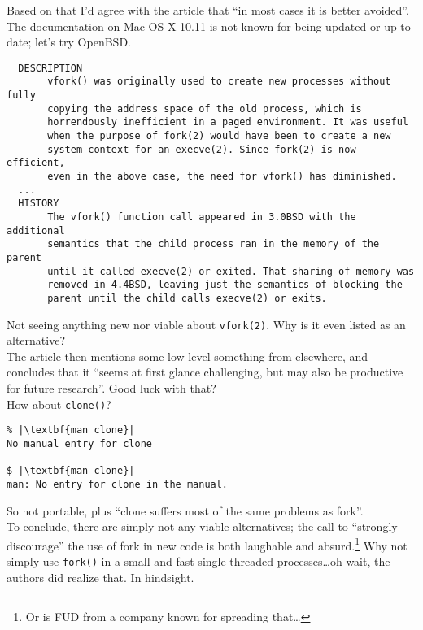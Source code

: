 \documentclass[10pt,a4paper]{article}
\begin{document}
Based on that I'd agree with the article that ``in most cases it is
better avoided''\citep[p.5]{Hotos2019}. The documentation on Mac OS X
10.11 is not known for being updated or up-to-date; let's try OpenBSD.

\begin{lstlisting}
  DESCRIPTION
       vfork() was originally used to create new processes without fully
       copying the address space of the old process, which is
       horrendously inefficient in a paged environment. It was useful
       when the purpose of fork(2) would have been to create a new
       system context for an execve(2). Since fork(2) is now efficient,
       even in the above case, the need for vfork() has diminished.
  ...
  HISTORY
       The vfork() function call appeared in 3.0BSD with the additional
       semantics that the child process ran in the memory of the parent
       until it called execve(2) or exited. That sharing of memory was
       removed in 4.4BSD, leaving just the semantics of blocking the
       parent until the child calls execve(2) or exits.
\end{lstlisting}

Not seeing anything new nor viable about \texttt{vfork(2)}. Why is it
even listed as an alternative? \\

The article then mentions some low-level something from elsewhere,
and concludes that it ``seems at first glance challenging, but may
also be productive for future research''\citep[p.6]{Hotos2019}. Good
luck with that? \\

How about \texttt{clone()}?

\begin{lstlisting}
% |\textbf{man clone}|
No manual entry for clone

$ |\textbf{man clone}|
man: No entry for clone in the manual.
\end{lstlisting}

So not portable, plus ``clone suffers most of the same
problems as fork''\citep[p.6]{Hotos2019}. \\

To conclude, there are simply not any viable alternatives; the call to
``strongly discourage'' the use of fork in new code is both laughable
and absurd.\footnote{Or is FUD from a company known for spreading
that\ldots} Why not simply use \texttt{fork()} in a small and fast
single threaded processes\ldots oh wait, the authors did realize that.
In hindsight.


\end{document}
